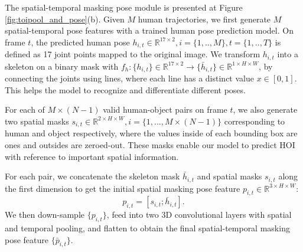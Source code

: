 \documentclass[sigconf]{acmart}
\begin{document}
The spatial-temporal masking pose module is presented at Figure \ref{fig:toipool_and_pose}(b).
Given $M$ human trajectories, we first generate $M$ spatial-temporal pose features with a trained human pose prediction model.
On frame $t$, the predicted human pose $h_{i,t} \in \mathbb{R}^{17 \times 2}, i=\{1,..,M\}, t=\{1,..,T\}$ is defined as 17 joint points mapped to the original image.
We transform $h_{i,t}$ into a skeleton on a binary mask with $f_h: \{h_{i,t}\} \in \mathbb{R}^{17 \times 2} \to \{\bar{h}_{i,t}\} \in \mathbb{R}^{1 \times H \times W}$, by connecting the joints using lines, where each line has a distinct value $x \in [0, 1]$. 
This helps the model to recognize and differentiate different poses.

For each of $M \times (N-1)$ valid human-object pairs on frame $t$, we also generate two spatial masks $s_{i,t} \in \mathbb{R}^{2 \times H \times W}, i=\{1,...,M \times (N-1)\}$ corresponding to human and object respectively, where the values inside of each bounding box are ones and outsides are zeroed-out.
These masks enable our model to predict HOI with reference to important spatial information.

For each pair, we concatenate the skeleton mask $\bar{h}_{i,t}$ and spatial masks $s_{i,t}$ along the first dimension to get the initial spatial masking pose feature $p_{i,t} \in \mathbb{R}^{3 \times H \times W}$:
\begin{equation}
    p_{i,t} = [s_{i,t}; \bar{h}_{i,t}].
\end{equation}
We then down-sample $\{p_{i, t}\}$, feed into two 3D convolutional layers with spatial and temporal pooling, and flatten to obtain the final spatial-temporal masking pose feature $\{\bar{p}_{i,t}\}$.
\end{document}
